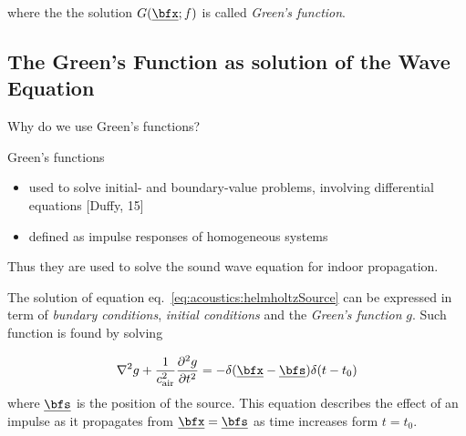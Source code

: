 where the the solution $G(\positionMicrophone ; f)$ is called \textit{Green's function}.

\subsection{The Green's Function as solution of the Wave Equation}

Why do we use Green's functions?

Green's functions
\begin{itemize}
    \item used to solve initial- and boundary-value problems, involving differential equations [Duffy, 15]
    \item defined as impulse responses of homogeneous systems
\end{itemize}
Thus they are used to solve the sound wave equation for indoor propagation.

The solution of equation eq.~\cref{eq:acoustics:helmholtzSource} can be expressed in term of \textit{bundary conditions},
\textit{initial conditions} and the \textit{Green's function} $g$.
Such function is found by solving

\begin{equation}
    \knabla^2 g + \frac{1}{\cair^2} \kpderiv[2]{g}{t} = - \delta(\positionMicrophone - \positionSource)\delta(t - t_0)
\end{equation}
where $\positionSource$ is the position of the source.
This equation describes the effect of an impulse as it propagates from $\positionMicrophone=\positionSource$ as time increases form $t = t_0$.






